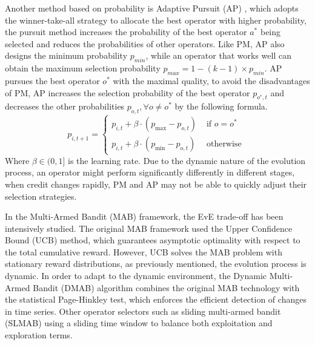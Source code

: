 \documentclass[journal]{IEEEtran}
\begin{document}
Another method based on probability is Adaptive Pursuit (AP) \cite{thierens2007adaptive}, which adopts the winner-take-all strategy to allocate the best operator with higher probability, the pursuit method increases the probability of the best operator $a^*$ being selected and reduces the probabilities of other operators.
Like PM, AP also designs the minimum probability $p_{min}$, while an operator that works well can obtain the maximum selection probability $p_{max} = 1-(k-1)\times p_{min}$.
AP pursues the best operator $o^*$ with the maximal quality, to avoid the disadvantages of PM, AP increases the selection probability of the best operator $p_{o^*,t}$ and decreases the other probabilities $p_{o,t}, \forall o \neq o^*$ by the following formula.
\begin{equation}
  p_{i, t+1}=\left\{\begin{array}{ll}
    p_{i, t}+\beta \cdot\left(p_{\max }-p_{o, t}\right) & \text { if } o=o^{*} \\
    p_{i, t}+\beta \cdot\left(p_{\min }-p_{o, t}\right) & \text { otherwise }
  \end{array}\right.
  \label{eq: AP}
\end{equation}
Where $\beta \in (0,1]$ is the learning rate.
% 
% 
Due to the dynamic nature of the evolution process, an operator might perform significantly differently in different stages, when credit changes rapidly, PM and AP may not be able to quickly adjust their selection strategies.

In the Multi-Armed Bandit (MAB) framework, the EvE trade-off has been intensively studied.
The original MAB framework used the Upper Confidence Bound (UCB) \cite{auer2002finite} method, which guarantees asymptotic optimality with respect to the total cumulative reward. However, UCB solves the MAB problem with stationary reward distributions, as previously mentioned, the evolution process is dynamic.
In order to adapt to the dynamic environment, the Dynamic Multi-Armed Bandit (DMAB) \cite{dacosta2008adaptive} algorithm combines the original MAB technology with the statistical Page-Hinkley test, which enforces the efficient detection of changes in time series.
Other operator selectors such as sliding multi-armed bandit (SLMAB) \cite{fialho2010analyzing} using a sliding time window to balance both exploitation and exploration terms.
\end{document}
